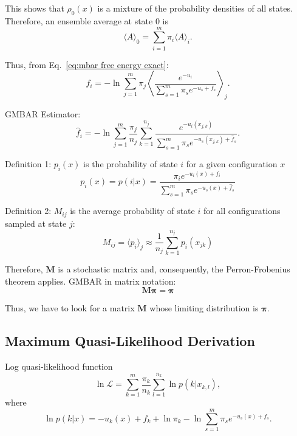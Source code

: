 \documentclass[aip,jcp,preprint,amsmath,amssymb]{revtex4-1}
\newcommand{\mt}[1]{\boldsymbol{\mathbf{#1}}}           %
\newcommand{\vt}[1]{\boldsymbol{\mathbf{#1}}}           %
\begin{document}
This shows that $\rho_0(x)$ is a mixture of the probability densities of all states. Therefore, an ensemble average at state $0$ is
\begin{equation*}
\langle A \rangle_0 = \sum_{i=1}^m \pi_i \langle A \rangle_i.
\end{equation*}

Thus, from Eq.~\eqref{eq:mbar free energy exact}:
\begin{equation}
f_i = -\ln \sum_{j=1}^m \pi_j \left\langle \frac{e^{-u_i}}{\sum_{s=1}^m \pi_s e^{-u_s + f_s}} \right\rangle_j.
\end{equation}

GMBAR Estimator:
\begin{equation}
\hat f_i = -\ln \sum_{j=1}^m \frac{\pi_j}{n_j} \sum_{k=1}^{n_j} \frac{e^{-u_i(x_{j,k})}}{\sum_{s=1}^m \pi_s e^{-u_s(x_{j,k}) + \hat f_s}}.
\end{equation}


Definition 1: $p_i(x)$ is the probability of state $i$ for a given configuration $x$
\begin{equation}
p_i(x) = p(i|x) = \frac{\pi_i e^{-u_i(x) + f_i}}{\sum_{s=1}^m \pi_s e^{-u_s(x) + \hat f_s}}
\end{equation}

Definition 2: $M_{ij}$ is the average probability of state $i$ for all configurations sampled at state $j$:
\begin{equation*}
M_{ij} = \langle p_i \rangle_j \approx \frac{1}{n_j} \sum_{k=1}^{n_j} p_i(x_{jk})
\end{equation*}

Therefore, $\vt M$ is a stochastic matrix and, consequently, the Perron-Frobenius theorem applies. GMBAR in matrix notation:
\begin{equation*}
\mt M \vt \pi = \vt \pi
\end{equation*}

Thus, we have to look for a matrix $\mt M$ whose limiting distribution is $\vt \pi$.

\subsection{Maximum Quasi-Likelihood Derivation}

Log quasi-likelihood function\cite{Geyer_1992, Geyer_1994}
\begin{equation}
\label{eq:gmbar log quasi-likelihood}
\ln \mathcal L = \sum_{k=1}^m \frac{\pi_k}{n_k} \sum_{l=1}^{n_k} \ln p(k|x_{k,l}),
\end{equation}
where
\begin{equation*}
\ln p(k|x) = -u_k(x) + f_k + \ln \pi_k - \ln \sum_{s=1}^m \pi_s e^{-u_s(x) + f_s}.
\end{equation*}
\end{document}
